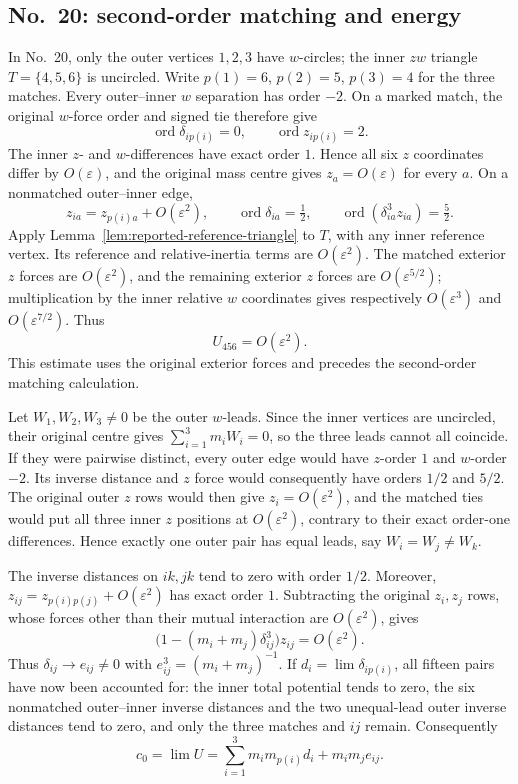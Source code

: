 \documentclass[11pt]{amsart}
\theoremstyle{remark}
\newcommand{\ord}{\operatorname{ord}}
\begin{document}
\subsection{No.~20: second-order matching and energy}\label{sec:no20-energy}
In No.~20, only the outer vertices $1,2,3$ have $w$-circles; the inner $zw$ triangle $T=\{4,5,6\}$ is uncircled. Write $p(1)=6$, $p(2)=5$, $p(3)=4$ for the three matches. Every outer--inner $w$ separation has order $-2$. On a marked match, the original $w$-force order and signed tie therefore give
\[
 \ord\delta_{i p(i)}=0,\qquad \ord z_{i p(i)}=2.
\]
The inner $z$- and $w$-differences have exact order $1$. Hence all six $z$ coordinates differ by $O(\varepsilon)$, and the original mass centre gives $z_a=O(\varepsilon)$ for every $a$. On a nonmatched outer--inner edge,
\[
 z_{ia}=z_{p(i)a}+O(\varepsilon^2),\qquad
 \ord\delta_{ia}=\tfrac12,\qquad
 \ord(\delta_{ia}^3z_{ia})=\tfrac52.
\]
Apply Lemma~\ref{lem:reported-reference-triangle} to $T$, with any inner reference vertex. Its reference and relative-inertia terms are $O(\varepsilon^2)$. The matched exterior $z$ forces are $O(\varepsilon^2)$, and the remaining exterior $z$ forces are $O(\varepsilon^{5/2})$; multiplication by the inner relative $w$ coordinates gives respectively $O(\varepsilon^3)$ and $O(\varepsilon^{7/2})$. Thus
\[
 U_{456}=O(\varepsilon^2).
\]
This estimate uses the original exterior forces and precedes the second-order matching calculation.

Let $W_1,W_2,W_3\ne0$ be the outer $w$-leads. Since the inner vertices are uncircled, their original centre gives $\sum_{i=1}^3m_iW_i=0$, so the three leads cannot all coincide. If they were pairwise distinct, every outer edge would have $z$-order $1$ and $w$-order $-2$. Its inverse distance and $z$ force would consequently have orders $1/2$ and $5/2$. The original outer $z$ rows would then give $z_i=O(\varepsilon^2)$, and the matched ties would put all three inner $z$ positions at $O(\varepsilon^2)$, contrary to their exact order-one differences. Hence exactly one outer pair has equal leads, say $W_i=W_j\ne W_k$.

The inverse distances on $ik,jk$ tend to zero with order $1/2$. Moreover, $z_{ij}=z_{p(i)p(j)}+O(\varepsilon^2)$ has exact order $1$. Subtracting the original $z_i,z_j$ rows, whose forces other than their mutual interaction are $O(\varepsilon^2)$, gives
\[
 \bigl(1-(m_i+m_j)\delta_{ij}^3\bigr)z_{ij}
 =O(\varepsilon^2).
\]
Thus $\delta_{ij}\to e_{ij}\ne0$ with $e_{ij}^3=(m_i+m_j)^{-1}$. If $d_i=\lim\delta_{i p(i)}$, all fifteen pairs have now been accounted for: the inner total potential tends to zero, the six nonmatched outer--inner inverse distances and the two unequal-lead outer inverse distances tend to zero, and only the three matches and $ij$ remain. Consequently
\[
 c_0=\lim U=\sum_{i=1}^3m_i m_{p(i)}d_i+m_im_je_{ij}.
\]
\end{document}

